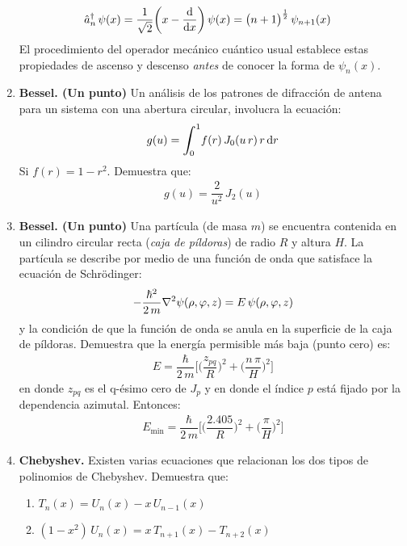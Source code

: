 \begin{enumerate}
\begin{align*}
\hat{a}_{n}^{\dagger} \, \psi (x) &= \dfrac{1}{\sqrt{2}} \bigg( x - \dv{x} \bigg) \, \psi (x) = \big( n + 1 \big)^{\frac{1}{2}} \, \psi_{n+1} (x)
\end{align*}
El procedimiento del operador mecánico cuántico usual establece estas propiedades de ascenso y descenso \emph{antes} de conocer la forma de $\psi_{n}(x)$.
\item \textbf{Bessel. (Un punto) } Un análisis de los patrones de difracción de antena para un sistema con una abertura circular, involucra la ecuación:
\begin{align*}
g(u) = \scaleint{6ex}_{\bs 0}^{1} f(r) \, J_{0}(u \, r) \, r \dd{r}
\end{align*}
Si $f(r) = 1 - r^{2}$. Demuestra que:
\begin{align*}
g(u) = \dfrac{2}{u^{2}} \, J_{2} (u)
\end{align*}
\item \textbf{Bessel. (Un punto) } Una partícula (de masa $m$) se encuentra contenida en un cilindro circular recta (\emph{caja de píldoras}) de radio $R$ y altura $H$. La partícula se describe por medio de una función de onda que satisface la ecuación de Schrödinger:
\begin{align*}
- \dfrac{\hbar^{2}}{2 \, m} \laplacian \psi (\rho, \varphi, z) = E \, \psi (\rho, \varphi, z)
\end{align*}
y la condición de que la función de onda se anula en la superficie de la caja de píldoras. Demuestra que la energía permisible más baja (punto cero) es:
\begin{align*}
E = \dfrac{\hbar}{2 \, m} \bigg[ \bigg( \dfrac{z_{pq}}{R} \bigg)^{2} + \bigg( \dfrac{n \, \pi}{H} \bigg)^{2} \bigg] 
\end{align*}
en donde $z_{pq}$ es el q-ésimo cero de $J_{p}$ y en donde el índice $p$ está fijado por la dependencia azimutal. Entonces:
\begin{align*}
E_{\min} = \dfrac{\hbar}{2 \, m} \bigg[ \bigg( \dfrac{2.405}{R} \bigg)^{2} + \bigg( \dfrac{\pi}{H} \bigg)^{2} \bigg] 
\end{align*}
\item \textbf{Chebyshev. } Existen varias ecuaciones que relacionan los dos tipos de polinomios de Chebyshev. Demuestra que:
\begin{enumerate}
\item $T_{n}(x) = U_{n}(x) - x \, U_{n-1}(x)$
\item $(1 - x^{2}) \, U_{n}(x) = x \, T_{n+1}(x) - T_{n+2}(x)$

\end{enumerate}
\end{enumerate}
